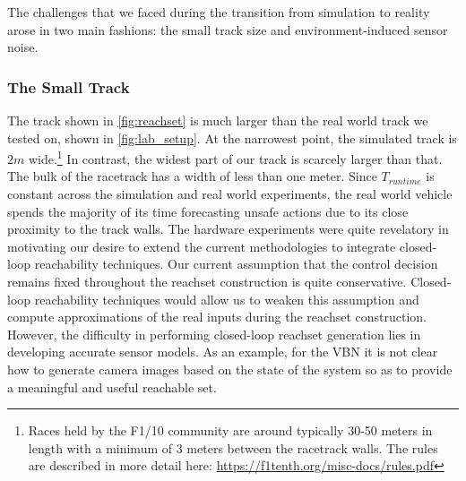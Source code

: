 \documentclass[manuscript,screen,review]{acmart}
\newcommand{\diego}[1]{\textcolor{purple}{\textbf{\underline{DM:}} #1}}
\begin{document}
The challenges that we faced during the transition from simulation to reality arose in two main fashions: the small track size and environment-induced sensor noise.

\subsubsection{The Small Track} The track shown in \ref{fig:reachset} is much larger than the real world track we tested on, shown in \ref{fig:lab_setup}. At the narrowest point, the simulated track is $2m$ wide.\footnote{Races held by the F1/10 community are around typically 30-50 meters in length with a minimum of 3 meters between the racetrack walls. The rules are described in more detail here: \url{https://f1tenth.org/misc-docs/rules.pdf}} In contrast, the widest part of our track is scarcely larger than that. The bulk of the racetrack has a width of less than one meter. Since $T_{runtime}$ is constant across the simulation and real world experiments, the real world vehicle spends the majority of its time forecasting unsafe actions due to its close proximity to the track walls. The hardware experiments were quite revelatory in motivating our desire to extend the current methodologies to integrate closed-loop reachability techniques. Our current assumption that the control decision remains fixed throughout the reachset construction is quite conservative. Closed-loop reachability techniques would allow us to weaken this assumption and compute approximations of the real inputs during the reachset construction. However, the difficulty in performing closed-loop reachset generation lies in developing accurate sensor models. As an example, for the VBN it is not clear how to generate camera images based on the state of the system so as to provide a meaningful and useful reachable set.
\end{document}

